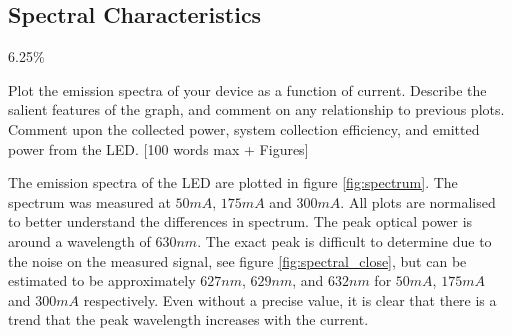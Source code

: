 \subsection{Spectral Characteristics}
\label{sec:test:spectral}

6.25\%

Plot the emission spectra of your device as a function of current. Describe the salient features of the graph, and comment on any relationship to previous plots. Comment upon the collected power, system collection efficiency, and emitted power from the LED. [100 words max + Figures]



The emission spectra of the LED are plotted in figure \ref{fig:spectrum}. The spectrum was measured at $50mA$, $175mA$ and $300mA$. All plots are normalised to better understand the differences in spectrum. The peak optical power is around a wavelength of $630nm$. The exact peak is difficult to determine due to the noise on the measured signal, see figure \ref{fig:spectral_close}, but can be estimated to be approximately $627nm$, $629nm$, and $632nm$ for $50mA$, $175mA$ and $300mA$ respectively. Even without a precise value, it is clear that there is a trend that the peak wavelength increases with the current.

